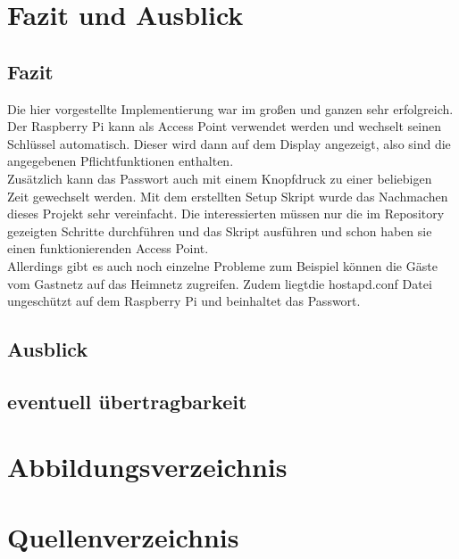 \documentclass[a4paper,11pt,singlespacing]{article}
\begin{document}
    \section{Fazit und Ausblick}
	    \subsection{Fazit}
	    	Die hier vorgestellte Implementierung war im großen und ganzen sehr erfolgreich. Der Raspberry Pi kann als Access Point verwendet werden und wechselt seinen Schlüssel automatisch. Dieser wird dann auf dem Display angezeigt, also sind die angegebenen Pflichtfunktionen enthalten. \\ Zusätzlich kann das Passwort auch mit einem Knopfdruck zu einer beliebigen Zeit gewechselt werden. Mit dem erstellten Setup Skript wurde das Nachmachen dieses Projekt sehr vereinfacht. Die interessierten müssen nur die im Repository \cite{Quote_github_repo} gezeigten Schritte durchführen und das Skript ausführen und schon haben sie einen funktionierenden Access Point. \\
	    	Allerdings gibt es auch noch einzelne Probleme zum Beispiel können die Gäste vom Gastnetz auf das Heimnetz zugreifen. Zudem liegtdie  hostapd.conf Datei ungeschützt auf dem Raspberry Pi und beinhaltet das Passwort.
	    \subsection{Ausblick}
	    \subsection{eventuell übertragbarkeit}
    
    
   	\pagebreak
   	\section{Abbildungsverzeichnis}
   	\listoffigures
   	\section{Quellenverzeichnis}
    
    
    	
\clearpage
\end{document}
